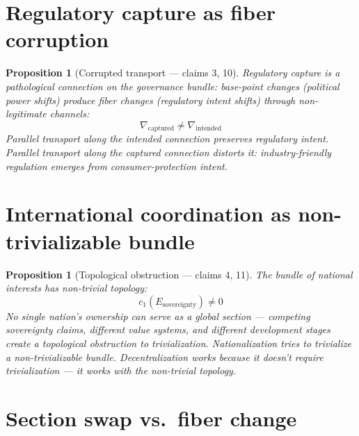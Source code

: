\documentclass[11pt,a4paper]{article}
\newtheorem{proposition}[definition]{Proposition}
\begin{document}
\section{Regulatory capture as fiber corruption}

\begin{proposition}[Corrupted transport --- claims 3, 10]
\label{prop:capture}
Regulatory capture is a pathological connection on the governance
bundle: base-point changes (political power shifts) produce fiber
changes (regulatory intent shifts) through non-legitimate channels:
\[
  \nabla_{\text{captured}} \neq \nabla_{\text{intended}}
\]
Parallel transport along the intended connection preserves
regulatory intent. Parallel transport along the captured connection
distorts it: industry-friendly regulation emerges from consumer-protection
intent.
\end{proposition}

\section{International coordination as non-trivializable bundle}

\begin{proposition}[Topological obstruction --- claims 4, 11]
\label{prop:sovereignty}
The bundle of national interests has non-trivial topology:
\[
  c_1(E_{\text{sovereignty}}) \neq 0
\]
No single nation's ownership can serve as a global section ---
competing sovereignty claims, different value systems, and different
development stages create a topological obstruction to
trivialization. Nationalization tries to trivialize a
non-trivializable bundle. Decentralization works because it doesn't
require trivialization --- it works with the non-trivial topology.
\end{proposition}


\section{Section swap vs.\ fiber change}
\label{sec:section-swap}
\end{document}
